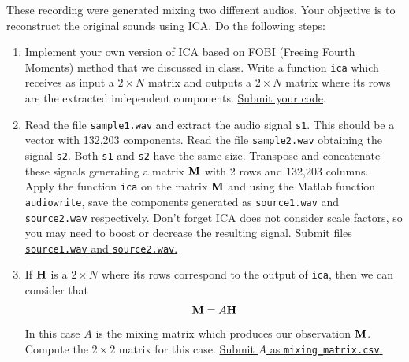 These recording were generated mixing two different audios. Your objective is to reconstruct the original sounds using ICA. Do the following steps:
\begin{enumerate}

    \item Implement your own version of ICA based on FOBI (Freeing Fourth Moments) method that we discussed in class. Write a function \texttt{ica} which receives as input a $2 \times N$ matrix and outputs a $2 \times N$ matrix where its rows are the extracted independent components. \ul{Submit your code}.
    
    \item Read the file \texttt{sample1.wav} and extract the audio signal \texttt{s1}. This should be a vector with 132,203 components. Read the file \texttt{sample2.wav} obtaining the signal \texttt{s2}. Both \texttt{s1} and \texttt{s2} have the same size. Transpose and concatenate these signals generating a matrix ${\bf M}$ with 2 rows and 132,203 columns.\\
    Apply the function \texttt{ica} on the matrix ${\bf M}$ and using the Matlab function \texttt{audiowrite}, save the components generated as \texttt{source1.wav} and \texttt{source2.wav} respectively. Don't forget ICA does not consider scale factors, so you may need to boost or decrease the resulting signal. \ul{Submit files \texttt{source1.wav} and \texttt{source2.wav}.}
    \item If ${\bf H}$ is a $2 \times N$ where its rows correspond to the output of \texttt{ica}, then we can consider that
    $$ {\bf M} = A {\bf H}$$
    In this case $A$ is the mixing matrix which produces our observation ${\bf M}$. Compute the $2 \times 2$ matrix for this case. \ul{Submit $A$ as \texttt{mixing\_matrix.csv}.} 
\end{enumerate}

\fi



